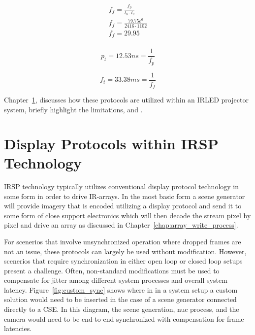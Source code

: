     \begin{equation}
        \begin{array}{ l }
            \displaystyle f_f={\frac{f_p}{l_h \cdot l_v}} \\[11pt]
            \displaystyle f_f={\frac{79.75e^6}{2416 \cdot 1102}} \\[11pt]
            \displaystyle f_f={29.95} \\[11pt]
        \end{array}
        \label{eq:f_f_solve}
    \end{equation}

    \begin{equation}
        p_t=12.53ns={\frac{1}{f_p}}
        \label{eq:p_t_solve}
    \end{equation}

    \begin{equation}
        f_t=33.38ms={\frac{1}{f_f}}
        \label{eq:f_t_solve}
    \end{equation}

    Chapter~\ref{sec:displays_within_proj_system}, discusses how these protocols are utilized within an IRLED projector system, briefly highlight the limitations, and . %

\section{Display Protocols within IRSP Technology}
    \label{sec:displays_within_proj_system}
    IRSP technology typically utilizes conventional display protocol technology in some form in order to drive IR-arrays. In the most basic form a scene generator will provide imagery that is encoded utilizing a display protocol and send it to some form of close support electronics which will then decode the stream pixel by pixel and drive an array as discussed in Chapter~\ref{chap:array_write_process}.

    For scenerios that involve unsynchronized operation where dropped frames are not an issue, these protocols can largely be used without modification. However, scenerios that require synchronization in either open loop or closed loop setups present a challenge. Often, non-standard modifications must be used to compensate for jitter among different system processes and overall system latency. Figure~\ref{fig:custom_sync} shows where in in a system setup a custom solution would need to be inserted in the case of a scene generator connected directly to a CSE. In this diagram, the scene generation, nuc process, and the camera would need to be end-to-end synchronized with compensation for frame latencies.

